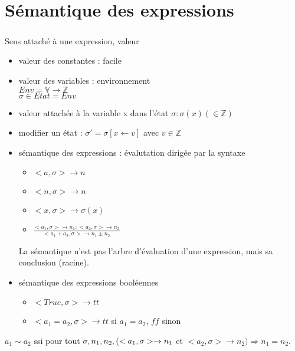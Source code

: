 \documentclass[10pt,a4paper]{article}
\begin{document}
\section{Sémantique des expressions}
\subparagraph*{} Sens attaché à une expression, valeur
\begin{itemize}
\item valeur des constantes : facile
\item valeur des variables : environnement \\
	$Env = \mathbb{V}\longrightarrow\mathbb{Z}$\\
	$ \sigma \in Etat = Env$ 
\item valeur attachée à la variable x dans l'état $\sigma : \sigma(x) \left( \in \mathbb{Z} \right)$
\item modifier un état : $\sigma ' = \sigma[x \leftarrow v]$ avec $v \in \mathbb{Z}$
\item sémantique des expressions : évalutation dirigée par la syntaxe\\
	\begin{itemize}
		\item $ <a, \sigma > \rightarrow n$ \\
		\item $ <n, \sigma > \rightarrow n$	\\
		\item $ <x, \sigma > \rightarrow \sigma(x)$\\
		\item $\displaystyle \frac{ <a_1, \sigma > \rightarrow n_1 ; <a_2, \sigma > \rightarrow n_2}{<a_1 + a_2, \sigma > \rightarrow n_1 \pm n_2}$\\
	\end{itemize}
\noindent La sémantique n'est pas l'arbre d'évaluation d'une expression, mais sa conclusion (racine).
	\item sémantique des expressions booléennes
		\begin{itemize}
			\item $<True, \sigma > \rightarrow tt$
			\item $<a_1 = a_2,  \sigma > \rightarrow tt$ si $a_1 = a_2$, $ff$ sinon
		\end{itemize}
\end{itemize}
\begin{definition} 
$a_1 \sim a_2$ ssi pour tout $\sigma, n_1, n_2,\\ (<a_1, \sigma> \rightarrow n_1$ et $<a_2, \sigma> \rightarrow n_2 ) \Rightarrow n_1 = n_2$.
\end{definition}
\end{document}
